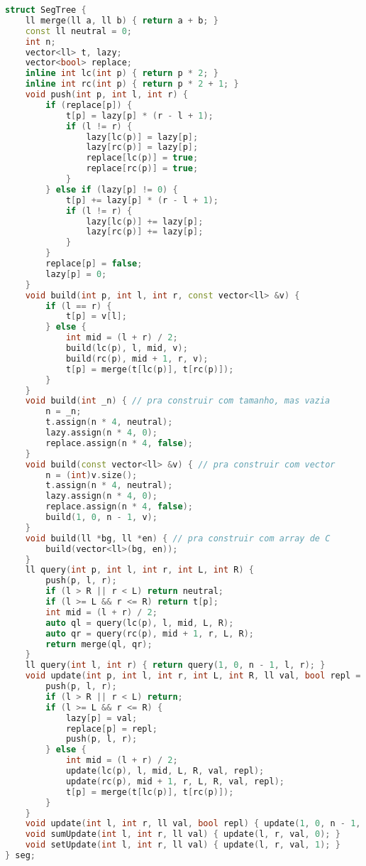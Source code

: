 \documentclass[10pt, a4paper, oneside]{book}
\begin{document}
\begin{lstlisting}[language=C++]
struct SegTree {
    ll merge(ll a, ll b) { return a + b; }
    const ll neutral = 0;
    int n;
    vector<ll> t, lazy;
    vector<bool> replace;
    inline int lc(int p) { return p * 2; }
    inline int rc(int p) { return p * 2 + 1; }
    void push(int p, int l, int r) {
        if (replace[p]) {
            t[p] = lazy[p] * (r - l + 1);
            if (l != r) {
                lazy[lc(p)] = lazy[p];
                lazy[rc(p)] = lazy[p];
                replace[lc(p)] = true;
                replace[rc(p)] = true;
            }
        } else if (lazy[p] != 0) {
            t[p] += lazy[p] * (r - l + 1);
            if (l != r) {
                lazy[lc(p)] += lazy[p];
                lazy[rc(p)] += lazy[p];
            }
        }
        replace[p] = false;
        lazy[p] = 0;
    }
    void build(int p, int l, int r, const vector<ll> &v) {
        if (l == r) {
            t[p] = v[l];
        } else {
            int mid = (l + r) / 2;
            build(lc(p), l, mid, v);
            build(rc(p), mid + 1, r, v);
            t[p] = merge(t[lc(p)], t[rc(p)]);
        }
    }
    void build(int _n) { // pra construir com tamanho, mas vazia
        n = _n;
        t.assign(n * 4, neutral);
        lazy.assign(n * 4, 0);
        replace.assign(n * 4, false);
    }
    void build(const vector<ll> &v) { // pra construir com vector
        n = (int)v.size();
        t.assign(n * 4, neutral);
        lazy.assign(n * 4, 0);
        replace.assign(n * 4, false);
        build(1, 0, n - 1, v);
    }
    void build(ll *bg, ll *en) { // pra construir com array de C
        build(vector<ll>(bg, en));
    }
    ll query(int p, int l, int r, int L, int R) {
        push(p, l, r);
        if (l > R || r < L) return neutral;
        if (l >= L && r <= R) return t[p];
        int mid = (l + r) / 2;
        auto ql = query(lc(p), l, mid, L, R);
        auto qr = query(rc(p), mid + 1, r, L, R);
        return merge(ql, qr);
    }
    ll query(int l, int r) { return query(1, 0, n - 1, l, r); }
    void update(int p, int l, int r, int L, int R, ll val, bool repl = 0) {
        push(p, l, r);
        if (l > R || r < L) return;
        if (l >= L && r <= R) {
            lazy[p] = val;
            replace[p] = repl;
            push(p, l, r);
        } else {
            int mid = (l + r) / 2;
            update(lc(p), l, mid, L, R, val, repl);
            update(rc(p), mid + 1, r, L, R, val, repl);
            t[p] = merge(t[lc(p)], t[rc(p)]);
        }
    }
    void update(int l, int r, ll val, bool repl) { update(1, 0, n - 1, l, r, val, repl); }
    void sumUpdate(int l, int r, ll val) { update(l, r, val, 0); }
    void setUpdate(int l, int r, ll val) { update(l, r, val, 1); }
} seg;
\end{lstlisting}
\hfill
\end{document}
